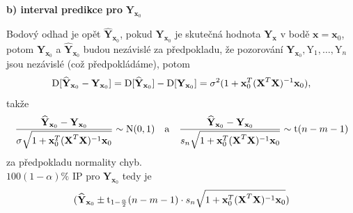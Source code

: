 \textbf{ b) interval predikce pro } $ \textbf{Y}_{\textbf{x}_0} $ 

Bodový odhad je opět $ \widehat{\textbf{Y}}_{\textbf{x}_0} $, pokud $ \textbf{Y}_{\textbf{x}_0} $  je skutečná hodnota $ \textbf{Y}_{\textbf{x}} $ v bodě $ \textbf{x} = \textbf{x}_0 $, potom $ \textbf{Y}_{\textbf{x}_0} $ a $ \widehat{\textbf{Y}}_{\textbf{x}_0} $ budou nezávislé za předpokladu, že pozorování $ \textbf{Y}_{\textbf{x}_0} , \text{Y}_1 , \dots , \text{Y}_n $ jsou nezávislé (což předpokládáme), 
potom 
$$
\mathrm{D} [ \widehat{\textbf{Y}}_{\textbf{x}_0} - \textbf{Y}_{\textbf{x}_0} ] = \mathrm{D} [ \widehat{\textbf{Y}}_{\textbf{x}_0} ] - \mathrm{D} [ \textbf{Y}_{\textbf{x}_0} ] = \sigma^{2}(1+ \textbf{x}_0^{T}( \textbf{X} ^{T} \textbf{X} )^{-1} \textbf{x}_0 ),
$$
takže
$$
\frac{\widehat{\textbf{Y}}_{\textbf{x}_0} - \textbf{Y}_{\textbf{x}_0}}{\sigma \sqrt{1+ \textbf{x}_0^{T}( \textbf{X} ^{T} \textbf{X} )^{-1} \textbf{x}_0 }} \sim \text{N}(0,1) \quad \text{a} \quad \frac{\widehat{\textbf{Y}}_{\textbf{x}_0} - \textbf{Y}_{\textbf{x}_0}}{s_n \sqrt{1+ \textbf{x}_0^{T}( \textbf{X} ^{T} \textbf{X} )^{-1} \textbf{x}_0 }} \sim \text{t}(n-m-1)
$$
za předpokladu normality chyb. \\
$ 100(1-\alpha) \% $ IP pro $ \textbf{Y}_{\textbf{x}_0} $ tedy je
$$
 (\widehat{\textbf{Y}}_{\textbf{x}_0} \pm \text{t}_{1 - \frac{\alpha}{2}}(n-m-1) \cdot s_n \sqrt{1+ \textbf{x}_0^{T}( \textbf{X} ^{T} \textbf{X} )^{-1} \textbf{x}_0 }) 
$$
